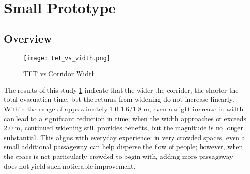 \section{Small Prototype}
\subsection{Overview}
\begin{figure}[h]
    \centering
    \texttt{[image: tet\_vs\_width.png]}
    \caption{TET vs Corridor Width}
    \label{fig:tet_vs_width}
\end{figure}
The results of this study \ref{fig:tet_vs_width} indicate that the wider the corridor, the shorter the total evacuation time, but the returns from widening do not increase linearly. Within the range of approximately 1.0-1.6/1.8 m, even a slight increase in width can lead to a significant reduction in time; when the width approaches or exceeds 2.0 m, continued widening still provides benefits, but the magnitude is no longer substantial. This aligns with everyday experience: in very crowded spaces, even a small additional passageway can help disperse the flow of people; however, when the space is not particularly crowded to begin with, adding more passageway does not yield such noticeable improvement.

